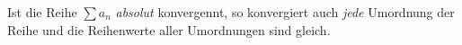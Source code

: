 Ist die Reihe $\sum a_n$ \textit{absolut} konvergennt, so konvergiert auch \textit{jede} Umordnung der Reihe und die Reihenwerte aller Umordnungen sind gleich.